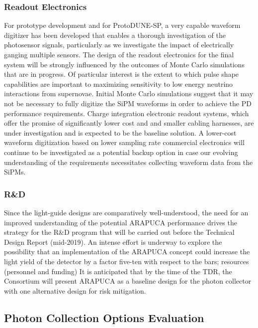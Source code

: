 \subsubsection{Readout Electronics} 
For prototype development and for ProtoDUNE-SP, a very capable waveform digitizer has been developed that enables a thorough investigation of the photosensor signals, particularly as we investigate the impact of electrically ganging multiple sensors. The design of the readout electronics for the final system will be strongly influenced by the outcomes of Monte Carlo simulations that are in progress. Of particular interest is the extent to which pulse  shape capabilities are important to maximizing sensitivity to low energy neutrino interactions from supernovae. 
Initial Monte Carlo simulations suggest that it may not be necessary to fully digitize the SiPM waveforms in order to achieve the PD performance requirements.  Charge integration electronic readout systems, which offer the promise of significantly lower cost and and smaller cabling harnesses, are under investigation and is expected to be the baseline solution.
A lower-cost waveform digitization based on lower sampling rate commercial electronics will continue to be investigated as a potential backup option in case our evolving understanding of the requirements necessitates collecting waveform data from the SiPMs.

\subsubsection{R\&D} 
Since the light-guide designs are comparatively well-understood, the need for an improved understanding of the potential ARAPUCA performance drives the strategy for the R\&D program that will be carried out before the Technical Design Report (mid-2019). 
An intense effort is underway to explore the possibility that an implementation of the ARAPUCA concept could increase the light yield of the  detector by a factor five-ten with respect to the bars; resources (personnel and funding) 
It is anticipated that by the time of the TDR, the Consortium will present ARAPUCA as a baseline design for the photon collector with one alternative design for risk mitigation.  


\subsection{Photon Collection Options Evaluation}

